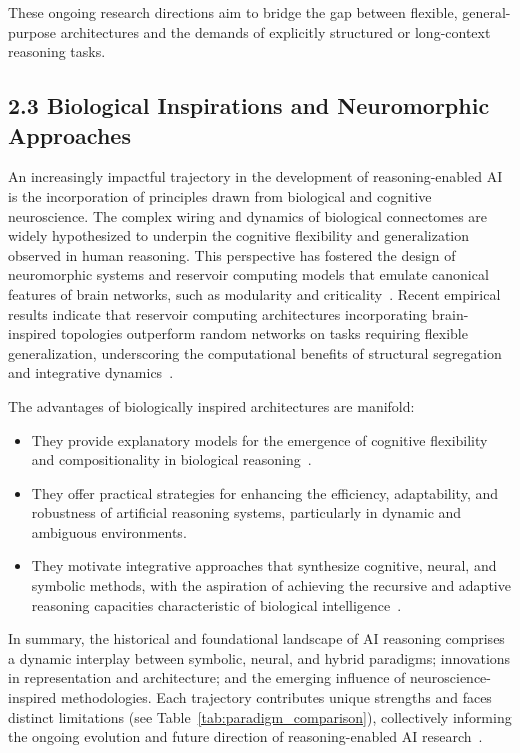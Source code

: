 \documentclass[11pt]{article}
\begin{document}
These ongoing research directions aim to bridge the gap between flexible, general-purpose architectures and the demands of explicitly structured or long-context reasoning tasks.

\subsection{2.3 Biological Inspirations and Neuromorphic Approaches}

An increasingly impactful trajectory in the development of reasoning-enabled AI is the incorporation of principles drawn from biological and cognitive neuroscience. The complex wiring and dynamics of biological connectomes are widely hypothesized to underpin the cognitive flexibility and generalization observed in human reasoning. This perspective has fostered the design of neuromorphic systems and reservoir computing models that emulate canonical features of brain networks, such as modularity and criticality~\cite{ref90}. Recent empirical results indicate that reservoir computing architectures incorporating brain-inspired topologies outperform random networks on tasks requiring flexible generalization, underscoring the computational benefits of structural segregation and integrative dynamics~\cite{ref90}.

The advantages of biologically inspired architectures are manifold:

\begin{itemize}
    \item They provide explanatory models for the emergence of cognitive flexibility and compositionality in biological reasoning~\cite{ref90}.
    \item They offer practical strategies for enhancing the efficiency, adaptability, and robustness of artificial reasoning systems, particularly in dynamic and ambiguous environments.
    \item They motivate integrative approaches that synthesize cognitive, neural, and symbolic methods, with the aspiration of achieving the recursive and adaptive reasoning capacities characteristic of biological intelligence~\cite{ref49,ref90}.
\end{itemize}

In summary, the historical and foundational landscape of AI reasoning comprises a dynamic interplay between symbolic, neural, and hybrid paradigms; innovations in representation and architecture; and the emerging influence of neuroscience-inspired methodologies. Each trajectory contributes unique strengths and faces distinct limitations (see Table~\ref{tab:paradigm_comparison}), collectively informing the ongoing evolution and future direction of reasoning-enabled AI research~\cite{ref42,ref49,ref54,ref86,ref90,ref100}.
\end{document}
